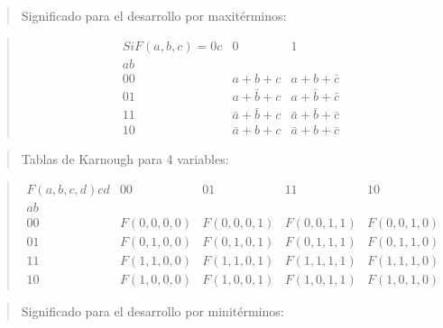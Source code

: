 \begin{quote}
Significado para el desarrollo por maxitérminos:
\end{quote}

\begin{quote}
\[\begin{matrix}
{\mathit{Si}F{{({a,b,c})} = 0}c} & 0 & 1 \\
\mathit{ab} & & \\
00 & {{a + b} + c} & {{a + b} + \bar{c}} \\
01 & {{a + \bar{b}} + c} & {{a + \bar{b}} + \bar{c}} \\
11 & {{\bar{a} + \bar{b}} + c} & {{\bar{a} + \bar{b}} + \bar{c}} \\
10 & {{\bar{a} + b} + c} & {{\bar{a} + b} + \bar{c}}
\end{matrix}\]
\end{quote}

\begin{quote}
Tablas de Karnough para 4 variables:
\end{quote}

\begin{quote}
\[\begin{matrix}
{F{({a,b,c,d})}\mathit{cd}} & 00 & 01 & 11 & 10 \\
\mathit{ab} & & & & \\
00 & {F{({0,0,0,0})}} & {F{({0,0,0,1})}} & {F{({0,0,1,1})}} & {F{({0,0,1,0})}} \\
01 & {F{({0,1,0,0})}} & {F{({0,1,0,1})}} & {F{({0,1,1,1})}} & {F{({0,1,1,0})}} \\
11 & {F{({1,1,0,0})}} & {F{({1,1,0,1})}} & {F{({1,1,1,1})}} & {F{({1,1,1,0})}} \\
10 & {F{({1,0,0,0})}} & {F{({1,0,0,1})}} & {F{({1,0,1,1})}} & {F{({1,0,1,0})}}
\end{matrix}\]
\end{quote}

\begin{quote}
Significado para el desarrollo por minitérminos:
\end{quote}

